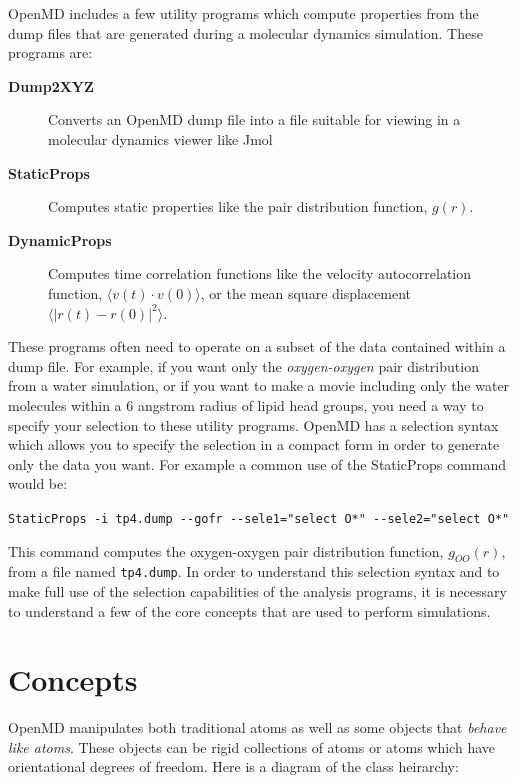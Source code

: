 \documentclass[]{book}
\begin{document}
{\sc OpenMD} includes a few utility programs which compute properties
from the dump files that are generated during a molecular dynamics
simulation.  These programs are:

\begin{description}
\item[{\bf Dump2XYZ}] Converts an {\sc OpenMD} dump file into a file
suitable for viewing in a molecular dynamics viewer like Jmol  
\item[{\bf StaticProps}] Computes static properties like the pair
distribution function, $g(r)$.
\item[{\bf DynamicProps}] Computes time correlation functions like the
velocity autocorrelation function, $\langle v(t) \cdot v(0)\rangle$,
or the mean square displacement $\langle |r(t) - r(0)|^{2} \rangle$.
\end{description}

These programs often need to operate on a subset of the data contained
within a dump file.  For example, if you want only the {\it oxygen-oxygen}
pair distribution from a water simulation, or if you want to make a
movie including only the water molecules within a 6 angstrom radius of
lipid head groups, you need a way to specify your selection to these
utility programs.  {\sc OpenMD} has a selection syntax which allows you to
specify the selection in a compact form in order to generate only the
data you want.  For example a common use of the StaticProps command
would be:

{\tt StaticProps -i tp4.dump -{}-gofr  -{}-sele1="select O*"  -{}-sele2="select O*"}

This command computes the oxygen-oxygen pair distribution function,
$g_{OO}(r)$, from a file named {\tt tp4.dump}.  In order to understand
this selection syntax and to make full use of the selection
capabilities of the analysis programs, it is necessary to understand a
few of the core concepts that are used to perform simulations. 

\section{\label{section:concepts}Concepts}

{\sc OpenMD} manipulates both traditional atoms as well as some objects that
{\it behave like atoms}.  These objects can be rigid collections of
atoms or atoms which have orientational degrees of freedom.  Here is a
diagram of the class heirarchy:
\end{document}
